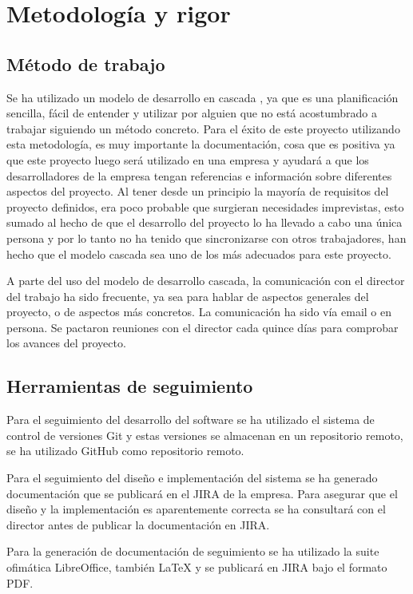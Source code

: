 \chapter{Metodología y rigor}
\section{Método de trabajo}
Se ha utilizado un modelo de desarrollo en cascada \cite{Tfg:waterfall}, ya que es una planificación sencilla, fácil de entender y utilizar por alguien que no está acostumbrado a trabajar siguiendo un método concreto. Para el éxito de este proyecto utilizando esta metodología, es muy importante la documentación, cosa que es positiva ya que este proyecto luego será utilizado en una empresa y ayudará a que los desarrolladores de la empresa tengan referencias e información sobre diferentes aspectos del proyecto. Al tener desde un principio la mayoría de requisitos del proyecto definidos, era poco probable que surgieran necesidades imprevistas, esto sumado al hecho de que el desarrollo del proyecto lo ha llevado a cabo una única persona y por lo tanto no ha tenido que sincronizarse con otros trabajadores, han hecho que el modelo cascada sea uno de los más adecuados para este proyecto.

A parte del uso del modelo de desarrollo cascada, la comunicación con el director del trabajo ha sido frecuente, ya sea para hablar de aspectos generales del proyecto, o de aspectos más concretos. La comunicación ha sido vía email o en persona. Se pactaron reuniones con el director cada quince días para comprobar los avances del proyecto. 

\section{Herramientas de seguimiento}
Para el seguimiento del desarrollo del software se ha utilizado el sistema de control de versiones Git y estas versiones se almacenan en un repositorio remoto, se ha utilizado GitHub como repositorio remoto.

Para el seguimiento del diseño e implementación del sistema se ha generado documentación que se publicará en el JIRA de la empresa. Para asegurar que el diseño y la implementación es aparentemente correcta se ha consultará con el director antes de publicar la documentación en JIRA.

Para la generación de documentación de seguimiento se ha utilizado la suite ofimática LibreOffice, también LaTeX y se publicará en JIRA bajo el formato PDF.

